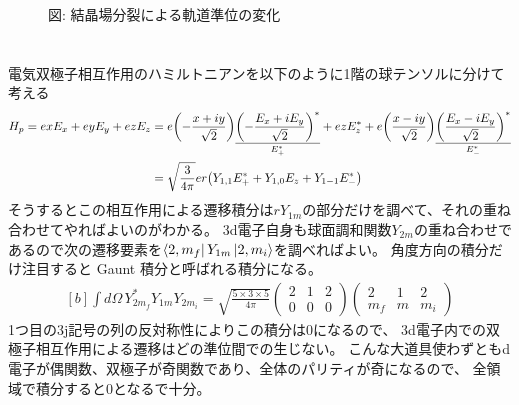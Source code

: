 \documentclass[../ap_2011.tex]{subfiles}
\begin{document}
\begin{figure}[h]
    \caption*{図: 結晶場分裂による軌道準位の変化}
\end{figure}

\section{}
電気双極子相互作用のハミルトニアンを以下のように1階の球テンソルに分けて考える
\begin{equation}\begin{aligned}[b]
    H_p = exE_x+eyE_y+ezE_z
    &= e\qty(-\frac{x+iy}{\sqrt{2}})\underset{E_+^*}{\underline{\qty(-\frac{E_x+iE_y}{\sqrt{2}})^*}}
    +ezE_z^*
    +e\qty(\frac{x-iy}{\sqrt{2}})\underset{E_-^*}{\underline{\qty(\frac{E_x-iE_y}{\sqrt{2}})^*}}\\
    &=\sqrt{\frac{3}{4\pi}}er\qty(Y_{1,1}E_+^* +Y_{1,0}E_z +Y_{1-1}E_-^*)
\end{aligned}\end{equation}
そうするとこの相互作用による遷移積分は\(rY_{1m}\)の部分だけを調べて、それの重ね合わせてやればよいのがわかる。
3d電子自身も球面調和関数\(Y_{2m}\)の重ね合わせであるので次の遷移要素を\(\bra{2,m_f}Y_{1m}\ket{2,m_i} \)を調べればよい。
角度方向の積分だけ注目すると Gaunt 積分と呼ばれる積分になる。
\begin{equation}\begin{aligned}[b]
    \int d\Omega\, Y_{2m_f}^*Y_{1m}Y_{2m_i}
    = \sqrt{\frac{5\times 3 \times 5}{4\pi}}\begin{pmatrix}
        2 & 1 & 2\\
        0 & 0 & 0
    \end{pmatrix}\begin{pmatrix}
        2 & 1 & 2\\
        m_f  & m & m_i
    \end{pmatrix}
\end{aligned}\end{equation}
1つ目の3j記号の列の反対称性によりこの積分は0になるので、
3d電子内での双極子相互作用による遷移はどの準位間での生じない。
こんな大道具使わずともd電子が偶関数、双極子が奇関数であり、全体のパリティが奇になるので、
全領域で積分すると0となるで十分。
\end{document}
